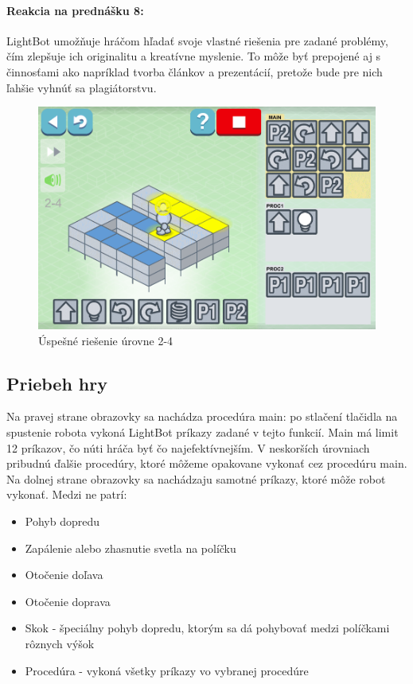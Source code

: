 \documentclass[slovak,a4paper,10pt]{article}
\begin{document}
\paragraph{Reakcia na prednášku 8:}
LightBot umožňuje hráčom hľadať svoje vlastné riešenia pre zadané problémy, čím zlepšuje ich originalitu a kreatívne myslenie. To môže byť prepojené aj s činnosťami ako napríklad tvorba článkov a prezentácií, pretože bude pre nich ľahšie vyhnúť sa plagiátorstvu.
\begin{figure}[h]
\includegraphics[scale=0.3]{lightbotmain}
\centering
\caption{Úspešné riešenie úrovne 2-4}
\label{fig:obr3}
\end{figure}
\subsection{Priebeh hry}
Na pravej strane obrazovky sa nachádza procedúra main: po stlačení tlačidla na spustenie robota vykoná LightBot príkazy zadané v tejto funkcií. Main má limit 12 príkazov, čo núti hráča byť čo najefektívnejším. V neskorších úrovniach pribudnú ďalšie procedúry, ktoré môžeme opakovane vykonať cez procedúru main. \\
Na dolnej strane obrazovky sa nachádzaju samotné príkazy, ktoré môže robot vykonať. Medzi ne patrí:
\begin{itemize}
\item Pohyb dopredu
\item Zapálenie alebo zhasnutie svetla na políčku
\item Otočenie doľava
\item Otočenie doprava
\item Skok - špeciálny pohyb dopredu, ktorým sa dá pohybovať medzi políčkami rôznych výšok
\item Procedúra - vykoná všetky príkazy vo vybranej procedúre
\end{itemize}
\end{document}
